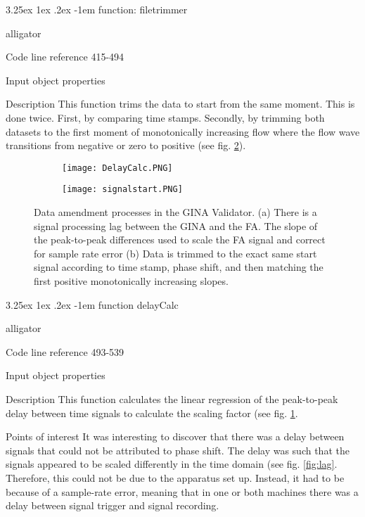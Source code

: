\documentclass[12pt, openany, oneside]{book}
\makeatletter
\renewcommand\subparagraph{\@startsection{subparagraph}{6}{\parindent}%
  {3.25ex \@plus1ex \@minus .2ex}%
  {-1em}%
  {\normalfont\normalsize\bfseries}}
\makeatother
\begin{document}
\subparagraph{function: filetrimmer}
\begin{labeling}{alligator}
\item[Code line reference] 415-494
\item[Input]object properties
\item[Description] This function trims the data to start from the same moment. This is done twice. First, by comparing time stamps. Secondly, by trimming both datasets to the first moment of monotonically increasing flow where the flow wave transitions from negative or zero to positive (see fig. \ref{fig:delay}).
\end{labeling}

\begin{figure}
\centering

		
	\begin{subfigure}{.99\textwidth}	
		\texttt{[image: DelayCalc.PNG]}		
		\caption{}
		\label{fig:trim}
	\end{subfigure}
	
	\begin{subfigure}{.99\textwidth}
		\texttt{[image: signalstart.PNG]}		
		\caption{}
		\label{fig:delay}
	\end{subfigure}
	
	\caption[Data amendments in the GINA Validator]{Data amendment processes in the GINA Validator. (a) There is a signal processing lag between the GINA and the FA. The slope of the peak-to-peak differences used to scale the FA signal and correct for sample rate error  (b) Data is trimmed to the exact same start signal according to time stamp, phase shift, and then matching the first positive monotonically increasing slopes.} 

\label{fig:calcs}

\end{figure}

\subparagraph{function delayCalc}
\begin{labeling}{alligator}
\item[Code line reference] 493-539
\item[Input]object properties
\item[Description] This function calculates the linear regression of the peak-to-peak delay between time signals to calculate the scaling factor (see fig. \ref{fig:trim}.
\item[Points of interest] It was interesting to discover that there was a delay between signals that could not be attributed to phase shift. The delay was such that the signals appeared to be scaled differently in the time domain (see fig. \ref{fig:lag}. Therefore, this could not be due to the apparatus set up. Instead, it had to be because of a sample-rate error, meaning that in one or both machines there was a delay between signal trigger and signal recording. 
\end{labeling}
\end{document}
